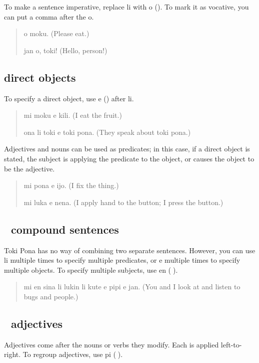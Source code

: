 \documentclass[statementpaper,oneside,article,14pt]{memoir}
\begin{document}
\noindent To make a sentence imperative, replace li with o ({}). To mark it as vocative, you can put a comma after the o.

\begin{quote}
  o moku. (Please eat.)

  jan o, toki! (Hello, person!)
\end{quote}

\subsection{{} direct objects}

\noindent To specify a direct object, use e ({}) after li.

\begin{quote}
  mi moku e kili. (I eat the fruit.)

  ona li toki e toki pona. (They speak about toki pona.)
\end{quote}

\noindent Adjectives and nouns can be used as predicates; in this case, if a direct object is stated,
the subject is applying the predicate to the object, or causes the object to be 
the adjective.

\begin{quote}
  mi pona e ijo. (I fix the thing.)

  mi luka e nena. (I apply hand to the button; I press the button.)
\end{quote}

\subsection{{\sitpon󱤊} compound sentences}

\noindent Toki Pona has no way of combining two separate sentences. However, you can use li multiple times 
to specify multiple predicates, or e multiple times to specify multiple objects. To specify 
multiple subjects, use en ({\sitpon󱤊}).

\begin{quote}
  mi en sina li lukin li kute e pipi e jan. (You and I look at and listen to bugs and people.)
\end{quote}


\subsection{{\sitpon󱥍} adjectives}

\noindent Adjectives come after the nouns or verbs they modify. Each is applied left-to-right. To regroup adjectives, use pi ({\sitpon󱥍}).
\end{document}
